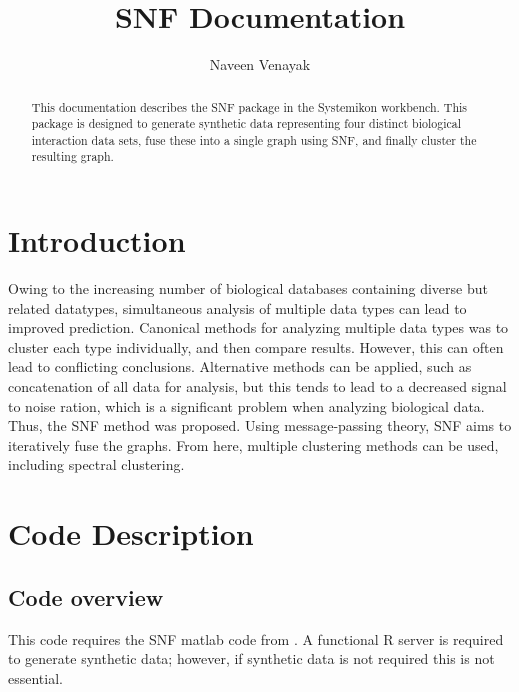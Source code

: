 \documentclass[doublespaced, 12pt]{article}
\title{SNF Documentation}
\author{Naveen Venayak}
\begin{document}
\maketitle

\begin{abstract}
This documentation describes the SNF package in the Systemikon workbench. This package is designed to generate synthetic data representing four distinct biological interaction data sets, fuse these into a single graph using SNF, and finally cluster the resulting graph.
\end{abstract}

\section{Introduction}
Owing to the increasing number of biological databases containing diverse but related datatypes, simultaneous analysis of multiple data types can lead to improved prediction. Canonical methods for analyzing multiple data types was to cluster each type individually, and then compare results. However, this can often lead to conflicting conclusions. Alternative methods can be applied, such as concatenation of all data for analysis, but this tends to lead to a decreased signal to noise ration, which is a significant problem when analyzing biological data. 
Thus, the SNF method was proposed. Using message-passing theory, SNF aims to iteratively fuse the graphs. From here, multiple clustering methods can be used, including spectral clustering.

\section{Code Description}
\subsection{Code overview}
This code requires the SNF matlab code from \citep{Wang2014}. A functional R server is required to generate synthetic data; however, if synthetic data is not required this is not essential.
\end{document}
